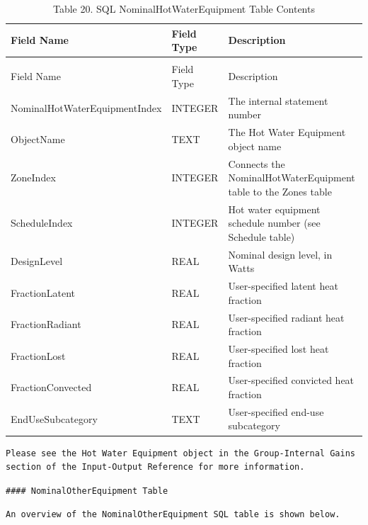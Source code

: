 \begin{longtable}[c]{p{1.5in}p{1.5in}p{2.99in}}
\caption{Table 20. SQL NominalHotWaterEquipment Table Contents \label{table:table-20.-sql-nominalhotwaterequipment-table}} \tabularnewline
\toprule 
Field Name & Field Type & Description \tabularnewline
\midrule
\endfirsthead

\caption[]{Table 20. SQL NominalHotWaterEquipment Table Contents} \tabularnewline
\toprule 
Field Name & Field Type & Description \tabularnewline
\midrule
\endhead

NominalHotWaterEquipmentIndex & INTEGER & The internal statement number \tabularnewline
ObjectName & TEXT & The Hot Water Equipment object name \tabularnewline
ZoneIndex & INTEGER & Connects the NominalHotWaterEquipment table to the Zones table \tabularnewline
ScheduleIndex & INTEGER & Hot water equipment schedule number (see Schedule table) \tabularnewline
DesignLevel & REAL & Nominal design level, in Watts \tabularnewline
FractionLatent & REAL & User-specified latent heat fraction \tabularnewline
FractionRadiant & REAL & User-specified radiant heat fraction \tabularnewline
FractionLost & REAL & User-specified lost heat fraction \tabularnewline
FractionConvected & REAL & User-specified convicted heat fraction \tabularnewline
EndUseSubcategory & TEXT & User-specified end-use subcategory \tabularnewline
\bottomrule
\end{longtable}

\begin{lstlisting}
Please see the Hot Water Equipment object in the Group-Internal Gains section of the Input-Output Reference for more information.
\end{lstlisting}

\begin{lstlisting}
#### NominalOtherEquipment Table
\end{lstlisting}

\begin{lstlisting}
An overview of the NominalOtherEquipment SQL table is shown below.
\end{lstlisting}

